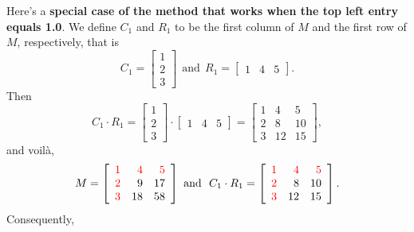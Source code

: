 Here's a \textbf{special case  of the method that works when the top left entry equals 1.0}. We define $C_1$  and $R_1$  to be the first column of $M$ and the first row of $M$, respectively, that is
$$C_1=\left[\begin{array}{r} 
    1  \\ 2 \\ 3  \end{array}  \right]~~\text{and}~~R_1=\left[\begin{array}{rrr} 
    1   &  4   &  5 \end{array}  \right].  $$
Then
$$
 C_1 \cdot R_1 =  \left[\begin{array}{r} 
    1  \\ 2 \\ 3  \end{array}  \right] \cdot \left[\begin{array}{rrr} 
    1   &  4   &  5 \end{array}  \right] = \left[\begin{array}{rrr} 
    1   &  4   &  5 \\
     2  &   8  &  10 \\
     3  &  12  &  15 \end{array}  \right],
$$
and voil\`a, 
$$M=\left[\begin{array}{rrr} 
   \color{red} 1   &   \color{red} 4   &  \color{red}  5 \\
     \color{red} 2  &   9  &  17 \\
   \color{red}   3  &  18  &  58 \end{array}  \right] \text{ and~~} C_1 \cdot R_1 = \left[\begin{array}{rrr} 
    \color{red} 1   &  \color{red} 4   &  \color{red} 5 \\
   \color{red}   2  &   8  &  10 \\
  \color{red}    3  &  12  &  15 \end{array}  \right].
$$
Consequently,
